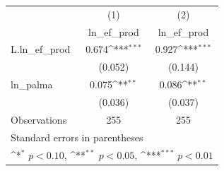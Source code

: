 {
\def\sym#1{\ifmmode^{#1}\else\(^{#1}\)\fi}
\begin{tabular}{l*{2}{c}}
\hline\hline
                    &\multicolumn{1}{c}{(1)}&\multicolumn{1}{c}{(2)}\\
                    &\multicolumn{1}{c}{ln\_ef\_prod}&\multicolumn{1}{c}{ln\_ef\_prod}\\
\hline
L.ln\_ef\_prod        &       0.674\sym{***}&       0.927\sym{***}\\
                    &     (0.052)         &     (0.144)         \\
[1em]
ln\_palma            &       0.075\sym{**} &       0.086\sym{**} \\
                    &     (0.036)         &     (0.037)         \\
\hline
Observations        &         255         &         255         \\
\hline\hline
\multicolumn{3}{l}{\footnotesize Standard errors in parentheses}\\
\multicolumn{3}{l}{\footnotesize \sym{*} \(p<0.10\), \sym{**} \(p<0.05\), \sym{***} \(p<0.01\)}\\
\end{tabular}
}
